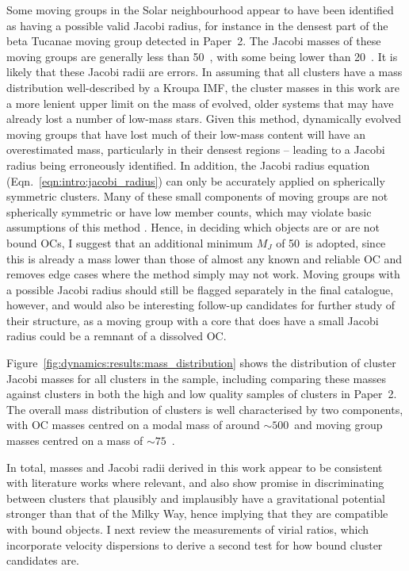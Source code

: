 Some moving groups in the Solar neighbourhood appear to have been identified as having a possible valid Jacobi radius, for instance in the densest part of the beta Tucanae moving group detected in Paper~2. The Jacobi masses of these moving groups are generally less than 50~\MSun, with some being lower than 20~\MSun. It is likely that these Jacobi radii are errors. In assuming that all clusters have a mass distribution well-described by a Kroupa IMF, the cluster masses in this work are a more lenient upper limit on the mass of evolved, older systems that may have already lost a number of low-mass stars. Given this method, dynamically evolved moving groups that have lost much of their low-mass content will have an overestimated mass, particularly in their densest regions -- leading to a Jacobi radius being erroneously identified. In addition, the Jacobi radius equation (Eqn.~\ref{eqn:intro:jacobi_radius}) can only be accurately applied on spherically symmetric clusters. Many of these small components of moving groups are not spherically symmetric or have low member counts, which may violate basic assumptions of this method \citep{binney_galactic_1987}. Hence, in deciding which objects are or are not bound OCs, I suggest that an additional minimum $M_J$ of 50~\MSun is adopted, since this is already a mass lower than those of almost any known and reliable OC and removes edge cases where the method simply may not work. Moving groups with a possible Jacobi radius should still be flagged separately in the final catalogue, however, and would also be interesting follow-up candidates for further study of their structure, as a moving group with a core that does have a small Jacobi radius could be a remnant of a dissolved OC.

Figure~\ref{fig:dynamics:results:mass_distribution} shows the distribution of cluster Jacobi masses for all clusters in the sample, including comparing these masses against clusters in both the high and low quality samples of clusters in Paper~2. The overall mass distribution of clusters is well characterised by two components, with OC masses centred on a modal mass of around $\sim500$~\MSun and moving group masses centred on a mass of $\sim75$~\MSun. 

In total, masses and Jacobi radii derived in this work appear to be consistent with literature works where relevant, and also show promise in discriminating between clusters that plausibly and implausibly have a gravitational potential stronger than that of the Milky Way, hence implying that they are compatible with bound objects. I next review the measurements of virial ratios, which incorporate velocity dispersions to derive a second test for how bound cluster candidates are. 


